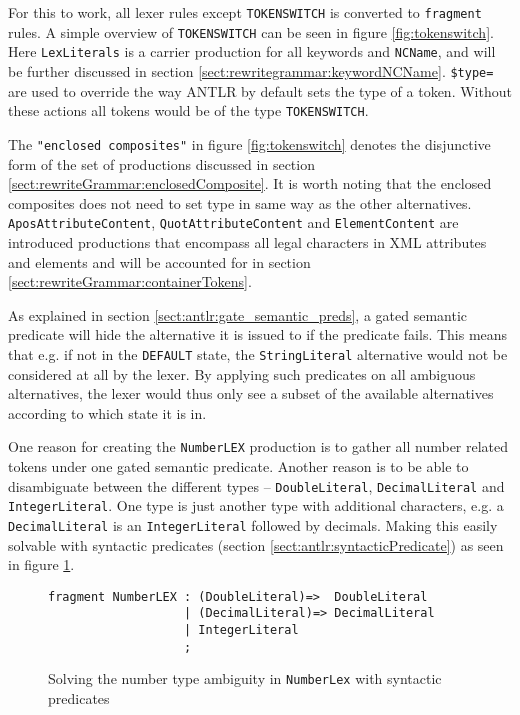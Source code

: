For this to work, all lexer rules except \verb!TOKENSWITCH! is converted to \verb!fragment! rules. A simple overview of \verb!TOKENSWITCH! can be seen in figure \ref{fig:tokenswitch}. Here \verb!LexLiterals! is a carrier production for all keywords and \verb!NCName!, and will be further discussed in section \ref{sect:rewritegrammar:keywordNCName}. \verb!$type=! are used to override the way ANTLR by default sets the type of a token. Without these actions all tokens would be of the type \verb!TOKENSWITCH!.

The \verb!"enclosed composites"! in figure \ref{fig:tokenswitch} denotes the
disjunctive form of the set of productions discussed in section \ref{sect:rewriteGrammar:enclosedComposite}. It is worth noting that the enclosed composites does not need to set type in same way as the other alternatives. \verb!AposAttributeContent!, \verb!QuotAttributeContent! and \verb!ElementContent! are introduced productions that encompass all legal characters in XML attributes and elements and will be accounted for in section \ref{sect:rewriteGrammar:containerTokens}.

As explained in section \ref{sect:antlr:gate_semantic_preds}, a gated semantic predicate will hide the alternative it is issued to if the predicate fails. This means that e.g. if not in the \verb!DEFAULT! state, the \verb!StringLiteral! alternative would not be considered at all by the lexer. By applying such predicates on all ambiguous alternatives, the lexer would thus only see a subset of the available alternatives according to which state it is in.

One reason for creating the \verb!NumberLEX! production is to gather all number related tokens under one gated semantic predicate. Another reason is to be able to disambiguate between the different types -- \verb!DoubleLiteral!, \verb!DecimalLiteral! and \verb!IntegerLiteral!. One type is just another type with additional characters, e.g. a \verb!DecimalLiteral! is an \verb!IntegerLiteral! followed by decimals. Making this easily solvable with syntactic predicates (section \ref{sect:antlr:syntacticPredicate}) as seen in figure \ref{fig:numberLex}.

\begin{figure}[h!]
\begin{Verbatim}
fragment NumberLEX : (DoubleLiteral)=>  DoubleLiteral
                   | (DecimalLiteral)=> DecimalLiteral
                   | IntegerLiteral
                   ;
\end{Verbatim}
\caption[Solving the number type ambiguity]{Solving the number type ambiguity in \texttt{NumberLex} with syntactic predicates}
\label{fig:numberLex}
\end{figure}

